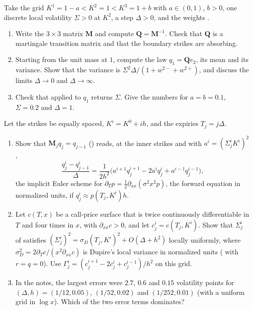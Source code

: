 \begin{exercise}\label{ex:afs-dlv-three}
\medium Take the grid $K^1=1-a<K^2=1<K^3=1+b$ with $a\in(0,1)$, $b>0$, one discrete local volatility $\Sigma>0$ at $K^2$, a step
$\Delta>0$, and the weights .
\begin{enumerate}[label=(\alph*)]
  \item Write the $3\times3$ matrix $\mathbf M$ and compute $\mathbf Q=\mathbf M^{-1}$. Check that $\mathbf Q$ is a martingale transition matrix and that
    the boundary strikes are absorbing.
  \item Starting from the unit mass at $1$, compute the law $q_1=\mathbf Qe_2$, its mean and its variance. Show that the variance is
    $\Sigma^2\Delta/(1+w^{2-}+w^{2+})$, and discuss the limits $\Delta\to0$ and $\Delta\to\infty$.
  \item Check that  applied to $q_1$ returns $\Sigma$. Give the numbers for $a=b=0.1$, $\Sigma=0.2$ and $\Delta=1$.
\end{enumerate}
\end{exercise}

\begin{exercise}\label{ex:afs-dupire-grid}
\medium Let the strikes be equally spaced, $K^i=K^0+ih$, and the expiries $T_j=j\Delta$.
\begin{enumerate}[label=(\alph*)]
  \item Show that $\mathbf M_jq_j=q_{j-1}$ () reads, at the inner strikes and with $a^i=(\Sigma_j^iK^i)^2$,
    \[
      \frac{q_j^i-q_{j-1}^i}\Delta=\frac1{2h^2}\Big(a^{i+1}q_j^{i+1}-2a^iq_j^i+a^{i-1}q_j^{i-1}\Big),
    \]
    the implicit Euler scheme for $\partial_Tp=\frac12\partial_{xx}(\sigma^2x^2p)$, the forward equation  in normalized
    units, if $q_j^i\approx p(T_j,K^i)h$.
  \item Let $c(T,x)$ be a call-price surface that is twice continuously differentiable in $T$ and four times in $x$, with
    $\partial_{xx}c>0$, and let $c_j^i=c(T_j,K^i)$. Show that $\Sigma_j^i$ of  satisfies
    $(\Sigma_j^i)^2=\sigma_D(T_j,K^i)^2+O(\Delta+h^2)$ locally uniformly, where $\sigma_D^2=2\partial_Tc/(x^2\partial_{xx}c)$ is Dupire's local
    variance in normalized units ( with $r=q=0$). Use $\Gamma_j^i=(c_j^{i+1}-2c_j^i+c_j^{i-1})/h^2$ on this grid.
  \item In the notes, the largest errors were $2.7$, $0.6$ and $0.15$ volatility points for $(\Delta,h)=(1/12,0.05)$, $(1/52,0.02)$ and
    $(1/252,0.01)$ (with a uniform grid in $\log x$). Which of the two error terms dominates?
\end{enumerate}
\end{exercise}

